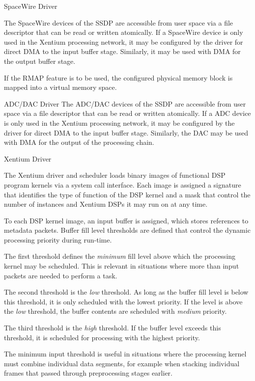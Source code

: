 %
{\gls{SpaceWire} Driver}{%
The \gls{SpaceWire} devices of the \gls{SSDP} are accessible from user space via
a file descriptor that can be read or written atomically.
If a \gls{SpaceWire} device is only used in the \gls{Xentium} processing
network, it may be configured by the driver for direct \gls{DMA} to the input
buffer stage. Similarly, it may be used with \gls{DMA} for the output buffer
stage.

If the \gls{RMAP} feature is to be used, the configured physical memory block
is mapped into a virtual memory space.
}%
{}{}


%
{\gls{ADC}/\gls{DAC} Driver}{%
The \gls{ADC}/\gls{DAC} devices of the \gls{SSDP} are accessible from user
space via a file descriptor that can be read or written atomically.
If a \gls{ADC} device is only used in the \gls{Xentium} processing
network, it may be configured by the driver for direct \gls{DMA} to the input
buffer stage. Similarly, the \gls{DAC} may be used with \gls{DMA} for the
output of the processing chain.
}%
{}{}


%
{Xentium Driver}{%
The \gls{Xentium} driver and scheduler loads binary images of functional
\gls{DSP} program kernels via a system call interface. Each image is assigned a
signature that identifies the type of function of the \gls{DSP} kernel and a
mask that control the number of instances and \gls{Xentium} \glspl{DSP} it
may run on at any time. \newline

To each \gls{DSP} kernel image, an input buffer is assigned, which stores
references to metadata packets. Buffer fill level thresholds are defined that
control the dynamic processing priority during run-time. \newline

The first threshold defines the \emph{minimum} fill level above which the
processing kernel may be scheduled. This is relevant in situations where more
than input packets are needed to perform a task.

The second threshold is the \emph{low} threshold.
As long as the buffer fill level is below this threshold, it is only scheduled
with the lowest priority. If the level is above the \emph{low} threshold, the
buffer contents are scheduled with \emph{medium} priority. \newline

The third threshold is the \emph{high} threshold. If the buffer level exceeds
this threshold, it is scheduled for processing with the highest priority.
}%
{}{%
The minimum input threshold is useful in situations where the processing kernel
must combine individual data segments, for example when stacking individual
frames that passed through preprocessing stages earlier.
}


